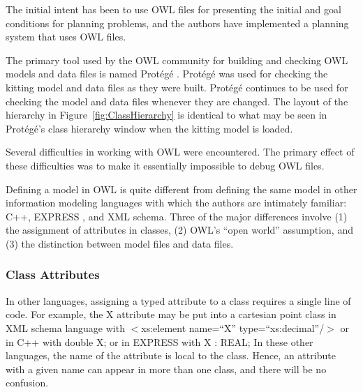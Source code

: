 The initial intent has been to use OWL files for presenting the initial and
goal conditions for planning problems, and the authors have implemented a
planning system that uses OWL files.

The primary tool used by the OWL community for building and checking OWL
models and data files is named Prot\'{e}g\'{e} \cite{Horridge.2011}.  Prot\'{e}g\'{e} was
used for checking the kitting model and data files as they were
built.  Prot\'{e}g\'{e} continues to be used for checking the model and data files
whenever they are changed. The layout of the hierarchy in
Figure~\ref{fig:ClassHierarchy} is identical to what may be seen in
 Prot\'{e}g\'{e}'s class hierarchy window when the kitting model is loaded.

Several difficulties in working with OWL were encountered. The primary
effect of these difficulties was to make it essentially impossible to
debug OWL files.

Defining a model in OWL is quite different from defining the same model in
other information modeling languages with which the authors are intimately
familiar: C++, EXPRESS \cite{EXPRESSmanual}, and XML schema. Three of the
major differences involve (1) the assignment of attributes in classes, (2)
OWL's ``open world'' assumption, and (3) the distinction between model
files and data files.\\

\subsubsection{Class Attributes}
In other languages, assigning a typed attribute to a class requires a
single line of code. For example, the X attribute may be put into a
cartesian point class in XML schema language with
\newline \sf $<$xs:element name=``X'' type=``xs:decimal''/$>$\rm
\newline or in C++ with
\newline \sf double X; \rm
\newline or in EXPRESS with
\newline \sf X : REAL; \rm \newline
In these other languages, the name of the attribute is local to the class.
Hence, an attribute with a given name can appear in more than one class, and
there will be no confusion.

